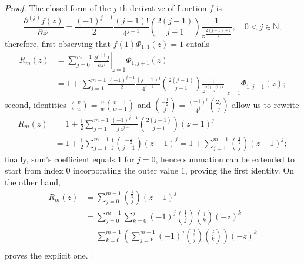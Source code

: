 \begin{proof}
The closed form of the $j$-th derivative of function $f$ is 
\begin{displaymath}
\frac{\partial^{(j)}{f}(z)}{\partial{z}^{j}} =\frac{(-1)^{j-1}}{2}\frac{(j-1)!}{4^{j-1}}{{2(j-1)}\choose{j-1}}\frac{1}{z^{\frac{2(j-1)+1}{2}}}, \quad 0 < j \in\mathbb{N};
\end{displaymath}
therefore, first observing that $f(1)\Phi_{1,1}(z)=1$ entails
\begin{displaymath}
\begin{split}
  R_{m}(z)  &= \sum_{j=0}^{m-1}{ \left. \frac{\partial^{(j)}{f}}{\partial{z}^{j}} \right|_{z=1}\Phi_{1,j+1}(z)}\\
            &= 1 + \sum_{j=1}^{m-1}{ \left. \frac{(-1)^{j-1}}{2}\frac{(j-1)!}{4^{j-1}}{{2(j-1)}\choose{j-1}}\frac{1}{z^{\frac{2(j-1)+1}{2}}} \right|_{z=1}\Phi_{1,j+1}(z)};
\end{split}
\end{displaymath}
second, identities ${ {v}\choose{w}} = \frac{v}{w} { {v-1}\choose{w-1} }$ and 
${ {-\frac{1}{2}}\choose{j} } = \frac{(-1)^{j}}{4^{j}}{ {2j}\choose{j} }$ allow us
to rewrite
\begin{displaymath}
\begin{split}
  R_{m}(z)  &= 1 + \frac{1}{2}\sum_{j=1}^{m-1}{ \frac{(-1)^{j-1}}{j\,4^{j-1}}{{2(j-1)}\choose{j-1}} \left(z-1\right)^{j}}\\
            &= 1 + \frac{1}{2}\sum_{j=1}^{m-1}{ \frac{1}{j}{-\frac{1}{2}\choose{j-1}} \left(z-1\right)^{j}}
             = 1 + \sum_{j=1}^{m-1}{ {\frac{1}{2}\choose{j}} \left(z-1\right)^{j}};
\end{split}
\end{displaymath}
finally, sum's coefficient equals $1$ for $j=0$, hence summation can be
extended to start from index $0$ incorporating the outer value $1$, proving the
first identity.  On the other hand,
\begin{displaymath}
\begin{split}
  R_{m}(z)  &= \sum_{j=0}^{m-1}{ {\frac{1}{2}\choose{j}} \left(z-1\right)^{j}}\\
            &= \sum_{j=0}^{m-1}{\sum_{k=0}^{j}{(-1)^{j}{\frac{1}{2}\choose{j}}{ {j}\choose{k} } \left(-z\right)^{k}}}\\
            &= \sum_{k=0}^{m-1}{\left(\sum_{j=k}^{m-1}{(-1)^{j}{\frac{1}{2}\choose{j}}{ {j}\choose{k} } }\right)\left(-z\right)^{k}}\\
\end{split}
\end{displaymath}
proves the explicit one.
\end{proof}


